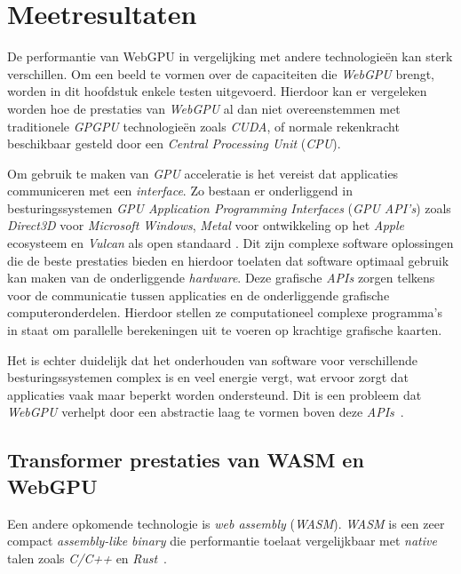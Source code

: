 \chapter{Meetresultaten}%
\label{ch:benchmarks}

De performantie van WebGPU in vergelijking met andere technologieën kan sterk verschillen. Om een beeld te vormen over de capaciteiten die \textit{WebGPU} brengt, worden in dit hoofdstuk enkele testen uitgevoerd. Hierdoor kan er vergeleken worden hoe de prestaties van \textit{WebGPU} al dan niet overeenstemmen met traditionele \textit{GPGPU} technologieën zoals \textit{CUDA}, of normale rekenkracht beschikbaar gesteld door een \textit{Central Processing Unit} (\textit{CPU}).

\bigbreak{}

Om gebruik te maken van \textit{GPU} acceleratie is het vereist dat applicaties communiceren met een \textit{interface}. Zo bestaan er onderliggend in besturingssystemen \textit{GPU Application Programming Interfaces} (\textit{GPU API's}) zoals \textit{Direct3D} voor \textit{Microsoft Windows}, \textit{Metal} voor ontwikkeling op het \textit{Apple} ecosysteem en \textit{Vulcan} als open standaard \autocite{Nguyen2022}. Dit zijn complexe software oplossingen die de beste prestaties bieden en hierdoor toelaten dat software optimaal gebruik kan maken van de onderliggende \textit{hardware}. Deze grafische \textit{APIs} zorgen telkens voor de communicatie tussen applicaties en de onderliggende grafische computeronderdelen. Hierdoor stellen ze computationeel complexe programma's in staat om parallelle berekeningen uit te voeren op krachtige grafische kaarten.

\bigbreak{}

Het is echter duidelijk dat het onderhouden van software voor verschillende besturingssystemen complex is en veel energie vergt, wat ervoor zorgt dat applicaties vaak maar beperkt worden ondersteund. Dit is een probleem dat \textit{WebGPU} verhelpt door een abstractie laag te vormen boven deze \textit{APIs}~\autocite{Wallez2023}.

\break{}

\section{Transformer prestaties van WASM en WebGPU}

Een andere opkomende technologie is \textit{web assembly} (\textit{WASM}). \textit{WASM} is een zeer compact \textit{assembly-like binary} die performantie toelaat vergelijkbaar met \textit{native} talen zoals \textit{C/C++} en \textit{Rust}~\autocite{Steiner2023}.

